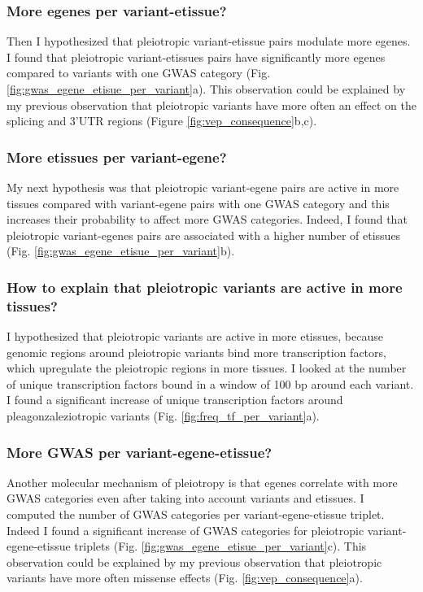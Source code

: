 \subsubsection*{More egenes per variant-etissue?}

Then I hypothesized that pleiotropic variant-etissue pairs modulate more egenes.
%
I found that pleiotropic variant-etissues pairs have significantly more egenes compared to variants with one GWAS category (Fig. \ref{fig:gwas_egene_etisue_per_variant}a).
%
This observation could be explained by my previous observation that pleiotropic variants have more often an effect on the splicing and 3'UTR regions (Figure \ref{fig:vep_consequence}b,c).

\subsubsection*{More etissues per variant-egene?}

My next hypothesis was that pleiotropic variant-egene pairs are active in more tissues compared with variant-egene pairs with one GWAS category and this increases their probability to affect more GWAS categories.
%
Indeed, I found that pleiotropic variant-egenes pairs are associated with a higher number of etissues (Fig. \ref{fig:gwas_egene_etisue_per_variant}b).

\subsubsection*{How to explain that pleiotropic variants are active in more tissues?}

I hypothesized that pleiotropic variants are active in more etissues, because genomic regions around pleiotropic variants bind more transcription factors, which upregulate the pleiotropic regions in more tissues.
%
I looked at the number of unique transcription factors bound in a window of 100 bp around each variant.
%
I found a significant increase of unique transcription factors around pleagonzaleziotropic variants (Fig. \ref{fig:freq_tf_per_variant}a).

\subsubsection*{More GWAS per variant-egene-etissue?}

Another molecular mechanism of pleiotropy is that egenes correlate with more GWAS categories even after taking into account variants and etissues.
%
I computed the number of GWAS categories per variant-egene-etissue triplet.
%
Indeed I found a significant increase of GWAS categories for pleiotropic variant-egene-etissue triplets (Fig. \ref{fig:gwas_egene_etisue_per_variant}c).
%
This observation could be explained by my previous observation that pleiotropic variants have more often missense effects (Fig. \ref{fig:vep_consequence}a).

